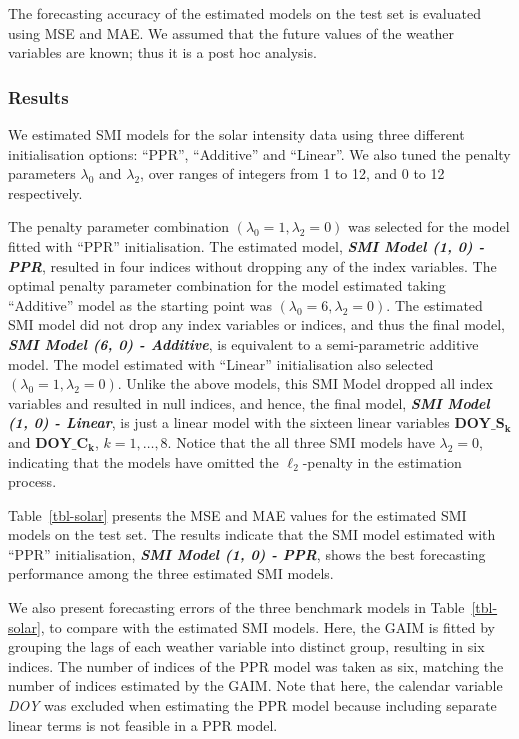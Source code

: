 \documentclass[
  11pt,
  a4paper,
]{article}
\begin{document}
The forecasting accuracy of the estimated models on the test set is
evaluated using MSE and MAE. We assumed that the future values of the
weather variables are known; thus it is a post hoc analysis.

\subsubsection{Results}\label{results-1}

We estimated SMI models for the solar intensity data using three
different initialisation options: ``PPR'', ``Additive'' and ``Linear''.
We also tuned the penalty parameters \(\lambda_{0}\) and
\(\lambda_{2}\), over ranges of integers from 1 to 12, and 0 to 12
respectively.

The penalty parameter combination \((\lambda_{0} = 1, \lambda_{2} = 0)\)
was selected for the model fitted with ``PPR'' initialisation. The
estimated model, \textbf{\emph{SMI Model (1, 0) - PPR}}, resulted in
four indices without dropping any of the index variables. The optimal
penalty parameter combination for the model estimated taking
``Additive'' model as the starting point was
\((\lambda_{0} = 6, \lambda_{2} = 0)\). The estimated SMI model did not
drop any index variables or indices, and thus the final model,
\textbf{\emph{SMI Model (6, 0) - Additive}}, is equivalent to a
semi-parametric additive model. The model estimated with ``Linear''
initialisation also selected \((\lambda_{0} = 1, \lambda_{2} = 0)\).
Unlike the above models, this SMI Model dropped all index variables and
resulted in null indices, and hence, the final model, \textbf{\emph{SMI
Model (1, 0) - Linear}}, is just a linear model with the sixteen linear
variables \(\textbf{DOY}\_\textbf{S}_{\bm{k}}\) and
\(\textbf{DOY}\_\textbf{C}_{\bm{k}}\), \(k = 1, \dots, 8\). Notice that
the all three SMI models have \(\lambda_{2} = 0\), indicating that the
models have omitted the \(\ell_{2}\)-penalty in the estimation process.

Table~\ref{tbl-solar} presents the MSE and MAE values for the estimated
SMI models on the test set. The results indicate that the SMI model
estimated with ``PPR'' initialisation, \textbf{\emph{SMI Model (1, 0) -
PPR}}, shows the best forecasting performance among the three estimated
SMI models.

We also present forecasting errors of the three benchmark models in
Table~\ref{tbl-solar}, to compare with the estimated SMI models. Here,
the GAIM is fitted by grouping the lags of each weather variable into
distinct group, resulting in six indices. The number of indices of the
PPR model was taken as six, matching the number of indices estimated by
the GAIM. Note that here, the calendar variable \emph{DOY} was excluded
when estimating the PPR model because including separate linear terms is
not feasible in a PPR model.
\end{document}
